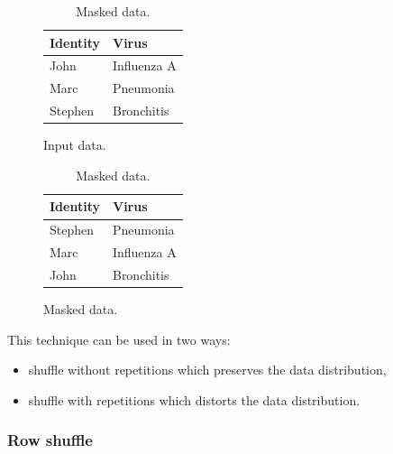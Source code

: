 \documentclass[a4paper,twoside,12pt]{book}
\begin{document}
\begin{table}
\centering
\caption{Randomisation – column shuffle.}
\begin{subfigure}{.4\textwidth}
\centering
\caption{Input data.}
\label{id:tab:attribute_randomisation_raw}
\begin{tabular}{ll}
\toprule
Identity & Virus        \\ \midrule
John     & Influenza A  \\
Marc     & Pneumonia    \\
Stephen  & Bronchitis   \\ \bottomrule
\end{tabular}
\end{subfigure}
\begin{subfigure}{.4\textwidth}
\centering
\caption{Masked data.}
\label{id:tab:attribute_randomisation_masked}
\begin{tabular}{ll}
\toprule
Identity & Virus         \\ \midrule
Stephen  & Pneumonia     \\
Marc     &  Influenza A  \\
John     & Bronchitis    \\ \bottomrule
\end{tabular}
\end{subfigure}
\end{table}
%
This technique can be used in two ways:
\begin{itemize}
\item shuffle without repetitions which preserves the data distribution,
\item shuffle with repetitions which distorts the data distribution.
\end{itemize}

\subsubsection{Row shuffle}
\end{document}
